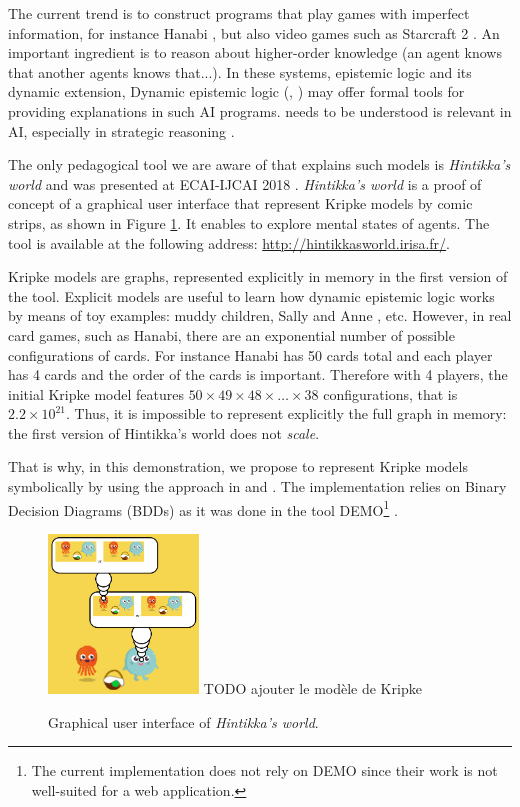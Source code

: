 The current trend is to construct programs that play games with imperfect information, for instance Hanabi \cite{DBLP:journals/corr/abs-1902-00506}, but also video games such as Starcraft 2 \cite{DBLP:conf/ijcai/HuLLPX18}. An important ingredient is to reason about higher-order knowledge (an agent knows that another agents knows that...). In these systems, epistemic logic and its dynamic extension, Dynamic epistemic logic (\cite{baltag1998logic}, \cite{DitmarschvdHoekKooi}) may offer formal tools for providing explanations in such AI programs. needs to be understood is relevant in AI, especially in strategic reasoning \cite{DBLP:journals/ijgt/Aumann99}.

The only pedagogical tool we are aware of that explains such models is \emph{Hintikka's world} and was presented at ECAI-IJCAI 2018 \cite{DBLP:conf/ijcai/Schwarzentruber18}. 
\emph{Hintikka's world} is a proof of concept of a graphical user interface that represent Kripke models by  comic strips, as shown in Figure \ref{figure:gui}. It enables to explore mental states of agents. The tool is available at the following address:
\url{http://hintikkasworld.irisa.fr/}. 


Kripke models are graphs, represented explicitly in memory in the first version of the tool. Explicit models are useful to learn how dynamic epistemic logic works by means of toy examples: muddy children, Sally and Anne  \cite{wimmer1983beliefs}, etc.  However, in real card games, such as Hanabi, there are an exponential number of possible configurations of cards. For instance Hanabi has 50 cards total and each player has 4 cards and the order of the cards is important. Therefore with 4 players, the initial Kripke model features $50 \times 49 \times 48 \times \dots \times 38$ configurations, that is $2.2 \times 10^{21}$. Thus, it is impossible to represent explicitly the full graph in memory:  the first version of Hintikka's world does not \emph{scale}. 

That is why, in this demonstration, we propose to represent Kripke models symbolically by using the approach in \cite{DBLP:conf/atal/CharrierS17} and \cite{DBLP:conf/aiml/CharrierS18}. The implementation relies on Binary Decision Diagrams (BDDs) \cite{DBLP:journals/tc/Bryant86} as it was done in the tool DEMO\footnote{The current implementation does not rely on DEMO since their work is not well-suited for a web application.}  \cite{DBLP:conf/lori/BenthemEGS15}. %






\begin{figure}
	\begin{center}
		\includegraphics[width=4cm]{screenshot.png} TODO ajouter le modèle de Kripke
	\end{center}
	\caption{Graphical user interface of \emph{Hintikka's world}.\label{figure:gui}}
\end{figure}
